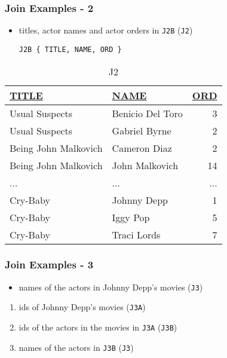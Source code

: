 \documentclass[dvipsnames]{beamer}
\theoremstyle{plain}
\begin{document}
\begin{frame}[fragile]
  \frametitle{Join Examples - 2}

  \begin{itemize}
    \item titles, actor names and actor orders in \texttt{J2B}
      (\texttt{J2})
    \begin{lstlisting}
J2B { TITLE, NAME, ORD }
    \end{lstlisting}
  \end{itemize}

  \vspace{-10pt}
  \begin{tiny}
  \begin{table}
    \caption{J2}
    \begin{tabular}{|l|l|r|}\hline
\underline{TITLE}    & \underline{NAME} & \underline{ORD}\\[2pt]\hline\hline
Usual Suspects       & Benicio Del Toro &   3\\\hline
Usual Suspects       & Gabriel Byrne    &   2\\\hline
Being John Malkovich & Cameron Diaz     &   2\\\hline
Being John Malkovich & John Malkovich   &  14\\\hline
...                  & ...              & ...\\\hline
Cry-Baby             & Johnny Depp      &   1\\\hline
Cry-Baby             & Iggy Pop         &   5\\\hline
Cry-Baby             & Traci Lords      &   7\\\hline
    \end{tabular}
  \end{table}
  \end{tiny}
\end{frame}

\begin{frame}
  \frametitle{Join Examples - 3}

  \begin{itemize}
    \item names of the actors in Johnny Depp's movies (\texttt{J3})
  \end{itemize}

  \pause
  \begin{enumerate}
    \item ids of Johnny Depp's movies (\texttt{J3A})

    \pause
    \item ids of the actors in the movies in \texttt{J3A} (\texttt{J3B})

    \pause
    \item names of the actors in \texttt{J3B} (\texttt{J3})
  \end{enumerate}
\end{frame}
\end{document}
